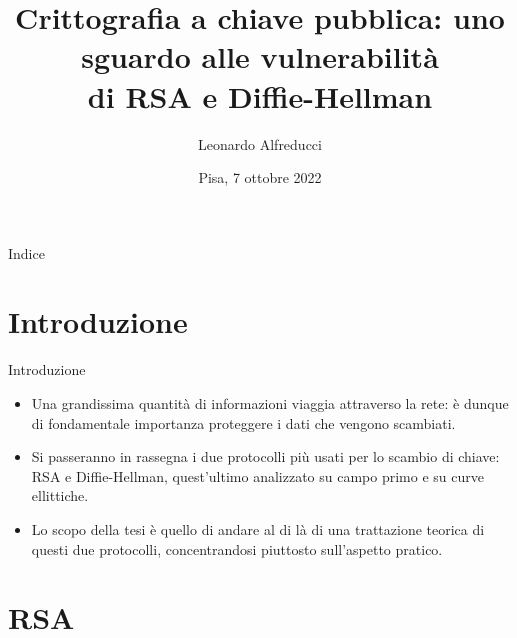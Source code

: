 \documentclass[11pt,svgnames,smaller,aspectratio=169,italian]{beamer}
\title{Crittografia a chiave pubblica: uno sguardo alle vulnerabilità \\ di RSA e Diffie-Hellman}
\author{Leonardo Alfreducci}
\institute[Università di Pisa]{Università di Pisa\\Dipartimento di Informatica}
\date{Pisa, 7 ottobre 2022}
\begin{document}
\begin{frame} 
	\titlepage
\end{frame}



\begin{frame}{Indice}
	\tableofcontents
\end{frame}

\section{Introduzione}
\begin{frame}
	\sectionpage
	\centering
\end{frame}

\begin{frame}{Introduzione}
	\begin{itemize}
		\item Una grandissima quantità di informazioni viaggia attraverso la rete: è dunque di fondamentale importanza proteggere i dati che vengono scambiati.
		\item Si passeranno in rassegna i due protocolli più usati per lo scambio di chiave: RSA e Diffie-Hellman, quest'ultimo analizzato su campo primo e su curve ellittiche.
		\item Lo scopo della tesi è quello di andare al di là di una trattazione teorica di questi due protocolli, concentrandosi piuttosto sull'aspetto pratico.
	\end{itemize}
\end{frame}

\section{RSA}
\begin{frame}
	\sectionpage
	\centering
\end{frame}
\end{document}
